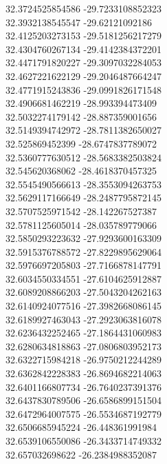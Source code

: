 {32.3724525854586	-29.7233108852323\\
32.3932138545547	-29.62121092186\\
32.4125203273153	-29.5181256217279\\
32.4304760267134	-29.4142384372201\\
32.4471791820227	-29.3097032284053\\
32.4627221622129	-29.2046487664247\\
32.4771915243836	-29.0991826171548\\
32.4906681462219	-28.993394473409\\
32.5032274179142	-28.887359001656\\
32.5149394742972	-28.7811382650027\\
32.525869452399	-28.6747837789072\\
32.5360777630512	-28.5683382503824\\
32.545620368062	-28.4618370457325\\
32.5545490566613	-28.3553094263753\\
32.5629117166649	-28.2487795872145\\
32.5707525971542	-28.142267527387\\
32.5781125605014	-28.035789779066\\
32.5850293223632	-27.9293600163309\\
32.5915376788572	-27.8229895629064\\
32.5976697205803	-27.7166878147791\\
32.6034550334551	-27.6104625912887\\
32.6089208866203	-27.5043204262163\\
32.6140924077516	-27.3982668086145\\
32.6189927463043	-27.2923063816078\\
32.6236432252465	-27.1864431060983\\
32.6280634818863	-27.0806803952173\\
32.6322715984218	-26.9750212244289\\
32.6362842228383	-26.8694682214063\\
32.6401166807734	-26.7640237391376\\
32.6437830789506	-26.6586899151504\\
32.6472964007575	-26.5534687192779\\
32.6506685945224	-26.448361991984\\
32.6539106550086	-26.3433714749332\\
32.657032698622	-26.2384988352087\\
}
